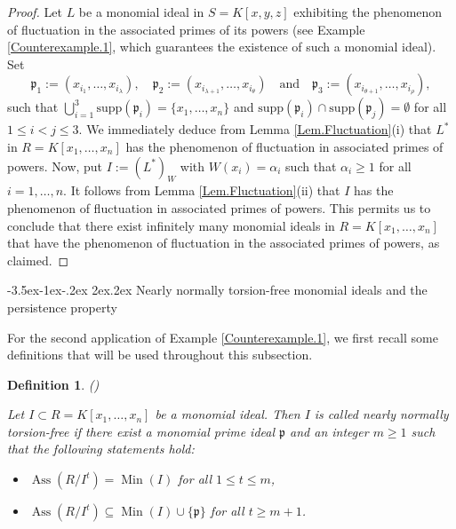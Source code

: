 \documentclass[11pt]{amsart}
\makeatletter
\newtheorem{definition}[theorem]{Definition}
\def\subsection{\@startsection{subsection}{2}{\z@}%
  {-3.5ex\@plus -1ex\@minus -.2ex}%
  {2ex\@plus .2ex}%
  {\normalfont\bfseries}}
\makeatother
\begin{document}
\begin{proof}
Let $L$ be a monomial ideal in $S=K[x,y,z]$ exhibiting the phenomenon of fluctuation in the associated primes of its powers
 (see Example \ref{Counterexample.1}, which guarantees the existence of such a monomial ideal). 
 Set    $$\mathfrak{p}_1:=(x_{i_1}, \ldots, x_{i_\lambda}), \quad  \mathfrak{p}_2:=(x_{i_{\lambda+1}}, \ldots, x_{i_\theta}) \quad  
  \text{and} \quad  \mathfrak{p}_3:=(x_{i_{\theta+1}}, \ldots, x_{i_\rho}),$$   such that 
   $\bigcup_{i=1}^3\mathrm{supp}(\mathfrak{p}_i)=\{x_1, \ldots, x_n\}$ and   $\mathrm{supp}(\mathfrak{p}_i) \cap    \mathrm{supp}(\mathfrak{p}_j)=\emptyset$  for all $1\leq i < j\leq 3$.  We immediately deduce 
   from  Lemma  \ref{Lem.Fluctuation}(i) that  $L^*$ in $R=K[x_1, \ldots, x_n]$  has the  phenomenon  of  fluctuation in associated primes
   of powers.  Now, put    $I:=(L^*)_W$ with $W(x_i)=\alpha_i$ such that $\alpha_i \geq 1$ for all $i=1, \ldots, n$.  It follows from  Lemma  \ref{Lem.Fluctuation}(ii)  that   $I$  has  the  phenomenon  of  fluctuation in  associated primes of powers. 
   This permits us to conclude that    there exist infinitely many  monomial ideals  in     $R=K[x_1, \ldots, x_n]$    that  have  the  phenomenon  of
  fluctuation in the associated primes of  powers, as claimed.   
\end{proof}


  \subsection{Nearly normally torsion-free monomial ideals and the persistence property} 
  
   For the second application of Example \ref{Counterexample.1}, we first recall some definitions that will be used throughout this subsection.
  

\begin{definition}(\cite[Definition 2.1]{Claudia}) \label{Def.NNTF}
{\em
Let $I \subset R = K[x_1,\dots,x_n]$ be a monomial ideal. Then $I$ is called \textit{nearly normally torsion-free} if  there exist  a monomial prime ideal $\mathfrak{p}$  and an integer $m \ge 1$ such that  the following statements hold:
\begin{itemize}
\item[(i)]  $\operatorname{Ass}(R/I^t) = \operatorname{Min}(I)$ for all $1 \le t \le m$,
\item[(ii)]   $\operatorname{Ass}(R/I^t) \subseteq \operatorname{Min}(I) \cup \{\mathfrak{p}\}$ for all $t \ge m+1$.
\end{itemize}
}
\end{definition}
\end{document}
